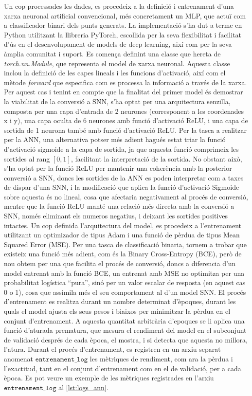 \documentclass[a4paper,11pt, titlepage, twoside]{article}
\begin{document}
Un cop processades les dades, es procedeix a la definició i entrenament d'una xarxa neuronal artificial convencional, més concretament un MLP, que actuï com a classificador binari dels punts generats. La implementació s'ha dut a terme en Python utilitzant la llibreria PyTorch, escollida per la seva flexibilitat i facilitat d'ús en el desenvolupament de models de deep learning, així com per la seva àmplia comunitat i suport. Es comença definint una classe que hereta de \textit{torch.nn.Module}, que representa el model de xarxa neuronal. Aquesta classe inclou la definició de les capes lineals i les funcions d'activació, així com el mètode \textit{forward} que especifica com es processa la informació a través de la xarxa. Per aquest cas i tenint en compte que la finalitat del primer model és demostrar la viabilitat de la conversió a SNN, s'ha optat per una arquitectura senzilla, composta per una capa d'entrada de 2 neurones (corresponent a les coordenades x i y), una capa oculta de 6 neurones amb funció d'activació ReLU, i una capa de sortida de 1 neurona també amb funció d'activació ReLU. Per la tasca a realitzar per la ANN, una alternativa potser més adient hagués estat triar la funció d'activació sigmoide a la capa de sortida, ja que aquesta funció comprimeix les sortides al rang $[0,1]$, facilitant la interpretació de la sortida. No obstant això, s'ha optat per la funció ReLU per mantenir una coherència amb la posterior conversió a SNN, doncs les sortides de la ANN es poden interpretar com a taxes de dispar d'una SNN, i la modificació que aplica la funció d'activació Sigmoide sobre aquesta és no lineal, cosa que afectaria negativament al procés de conversió, mentre que la funció ReLU manté una relació més directa amb la conversió a SNN, només eliminant els numeros negatius, i deixant les sortides positives intactes. Un cop definida l'arquitectura del model, es procedeix a l'entrenament utilitzant un optimizador de tipus Adam i una funció de pèrdua de tipus Mean Squared Error (MSE). Per una tasca de classificació binaria, tornem a trobar que existeix una funció més adient, com és la Binary Cross-Entropy (BCE), però de nou obtem per una que facilita el procés de conversió, doncs a diferencia d'un model entrenat amb la funció BCE, un entrenat amb MSE no optimitza per una probabilitat logística “pura”, sinó per un valor escalar de resposta (en aquest cas 0 o 1), cosa que assimila més el seu comportament al d'un model SNN.
El procés d'entrenament es realitza durant un nombre determinat d'èpoques, durant les quals el model ajusta els seus pesos i biaixos per minimitzar la pèrdua en el conjunt d'entrenament. A aquesta quantitat arbitrària d'epoques se li aplica una funció d'aturada prematura, que mesura el rendiment del model en el subconjunt de validació després de cada època, el mostra, i si detecta que aquesta no millora, l'atura. Durant el procés d'entrenament, es registren en un arxiu separat anomenat $\texttt{entrenament\_log}$ les mètriques de rendiment, com ara la pèrdua i l'exactitud, tant en el conjunt d'entrenament com en el de validació, per a cada època. Es pot veure un exemple de les mètriques registrades en l'arxiu $\texttt{entrenament\_log}$ al \autoref{lst:logs_ann}.
\end{document}
